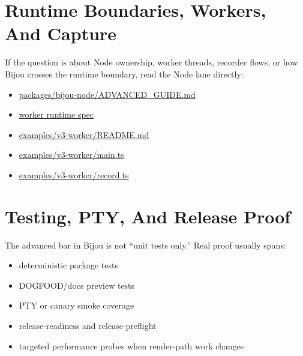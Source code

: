 \section{Runtime Boundaries, Workers, And Capture}\label{record-001-runtime-boundaries-workers-and-capture}

If the question is about Node ownership, worker threads, recorder flows, or how Bijou crosses the runtime boundary, read the Node lane directly:

\begin{itemize}
\tightlist
\item
  \href{https://github.com/flyingrobots/bijou/blob/cbd70612140e7a450d764b3c7be1c6af878b99bc/packages/bijou-node/ADVANCED_GUIDE.md}{packages/bijou-node/ADVANCED\_GUIDE.md}
\item
  \href{https://github.com/flyingrobots/bijou/blob/cbd70612140e7a450d764b3c7be1c6af878b99bc/docs/specs/worker-runtime.spec.json}{worker runtime spec}
\item
  \href{https://github.com/flyingrobots/bijou/blob/cbd70612140e7a450d764b3c7be1c6af878b99bc/examples/v3-worker/README.md}{examples/v3-worker/README.md}
\item
  \href{https://github.com/flyingrobots/bijou/blob/cbd70612140e7a450d764b3c7be1c6af878b99bc/examples/v3-worker/main.ts}{examples/v3-worker/main.ts}
\item
  \href{https://github.com/flyingrobots/bijou/blob/cbd70612140e7a450d764b3c7be1c6af878b99bc/examples/v3-worker/record.ts}{examples/v3-worker/record.ts}
\end{itemize}

\section{Testing, PTY, And Release Proof}\label{record-001-testing-pty-and-release-proof}

The advanced bar in Bijou is not ``unit tests only.'' Real proof usually spans:

\begin{itemize}
\tightlist
\item
  deterministic package tests
\item
  DOGFOOD/docs preview tests
\item
  PTY or canary smoke coverage
\item
  release-readiness and release-preflight
\item
  targeted performance probes when render-path work changes
\end{itemize}


